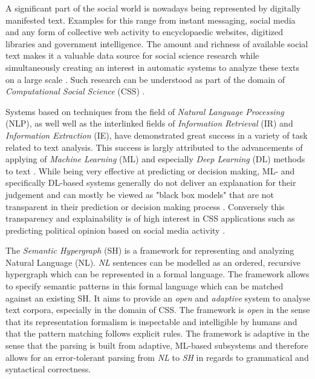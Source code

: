 \documentclass[11pt]{scrreprt}
\let\cite\parencite  %
\begin{document}
A significant part of the social world is nowadays being represented by digitally manifested text. Examples for this range from instant messaging, social media and any form of collective web activity to encyclopaedic websites, digitized libraries and government intelligence. The amount and richness of available social text makes it a valuable data source for social science research while simultaneously creating an interest in automatic systems to analyze these texts on a large scale \cite{evansMachineTranslationMining2016}. Such research can be understood as part of the domain of \textit{Computational Social Science} (CSS) \cite{lazerComputationalSocialScience2009}.

Systems based on techniques from the field of \textit{ Natural Language Processing} (NLP), as well well as the interlinked fields of \textit{Information Retrieval} (IR) and \textit{Information Extraction} (IE), have demonstrated great success in a variety of task related to text analysis. This success is largly attributed to the advancements of applying of \textit{Machine Learning} (ML) and especially \textit{Deep Learning} (DL) methods to text \cite{hirschbergAdvancesNaturalLanguage2015} \cite{qiuPretrainedModelsNatural2020}. While being very effective at predicting or decision making, ML- and specifically DL-based systems generally do not deliver an explanation for their judgement and can mostly be viewed as "black box models" that are not transparent in their prediction or decision making process \cite{rudinStopExplainingBlack2019}. Conversely this transparency and explainability is of high interest in CSS applications such as predicting political opinion based on social media activity \cite{wilkersonLargeScaleComputerizedText2017}.

The \textit{Semantic Hypergraph} (SH) \cite{menezesSemanticHypergraphs2021} is a framework for representing and analyzing Natural Language (NL). \textit{NL} sentences can be modelled as an ordered, recursive hypergraph which can be represented in a formal language. The framework allows to specify semantic patterns in this formal language which can be matched against an existing SH. It aims to provide an \textit{open} and \textit{adaptive} system to analyse text corpora, especially in the domain of CSS. The framework is \textit{open} in the sense that its representation formalism is inspectable and intelligible by humans and that the pattern matching follows explicit rules. The framework is adaptive in the sense that the parsing is built from adaptive, ML-based subsystems and therefore allows for an error-tolerant parsing from \textit{NL} to \textit{SH} in regards to grammatical and syntactical correctness.
\end{document}
